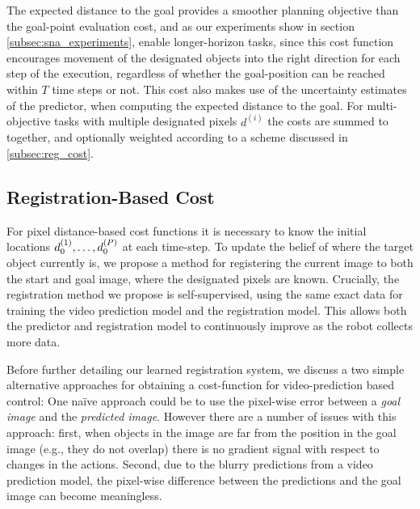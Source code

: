 The expected distance to the goal provides a smoother planning objective than the goal-point evaluation cost, and as our experiments show in section \ref{subsec:sna_experiments}, enable longer-horizon tasks, since this cost function encourages movement of the designated objects into the right direction for each step of the execution, regardless of whether the goal-position can be reached within $T$ time steps or not. This cost also makes use of the uncertainty estimates of the predictor, when computing the expected distance to the goal. For multi-objective tasks with multiple designated pixels $d^{(i)}$ the costs are summed to together, and optionally weighted according to a scheme discussed in \autoref{subsec:reg_cost}.  

\subsection{Registration-Based Cost}
\label{subsec:reg_cost}
For pixel distance-based cost functions it is necessary to know the initial locations $d_0^{(1)}, \dots, d_0^{(P)}$ at each time-step. To update the belief of where the target object currently is, we propose
a method for registering the current image to both the start and goal image, where the designated pixels are known. Crucially, the registration method we propose is self-supervised, using the same exact data for training the video prediction model and the registration model. This allows both the predictor and registration model to continuously improve as the robot collects more data.

Before further detailing our learned registration system, we discuss a two simple alternative approaches for obtaining a cost-function for video-prediction based control: One na\"{i}ve approach could be to use the pixel-wise error between a \emph{goal image} and the \emph{predicted image}. However there are a number of issues with this approach: first, when objects in the image are far from the position in the goal image (e.g., they do not overlap) there is no gradient signal with respect to changes in the actions. Second, due to the blurry predictions from a video prediction model, the pixel-wise difference between the predictions and the goal image can become meaningless. 

